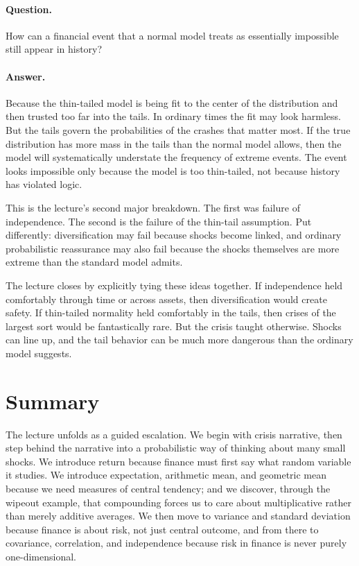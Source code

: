 \paragraph{Question.}
How can a financial event that a normal model treats as essentially impossible still appear in history?

\paragraph{Answer.}
Because the thin-tailed model is being fit to the center of the distribution and then trusted too far into the tails. In ordinary times the fit may look harmless. But the tails govern the probabilities of the crashes that matter most. If the true distribution has more mass in the tails than the normal model allows, then the model will systematically understate the frequency of extreme events. The event looks impossible only because the model is too thin-tailed, not because history has violated logic.

This is the lecture's second major breakdown. The first was failure of independence. The second is the failure of the thin-tail assumption. Put differently: diversification may fail because shocks become linked, and ordinary probabilistic reassurance may also fail because the shocks themselves are more extreme than the standard model admits.

The lecture closes by explicitly tying these ideas together. If independence held comfortably through time or across assets, then diversification would create safety. If thin-tailed normality held comfortably in the tails, then crises of the largest sort would be fantastically rare. But the crisis taught otherwise. Shocks can line up, and the tail behavior can be much more dangerous than the ordinary model suggests.

\section{Summary}

The lecture unfolds as a guided escalation. We begin with crisis narrative, then step behind the narrative into a probabilistic way of thinking about many small shocks. We introduce return because finance must first say what random variable it studies. We introduce expectation, arithmetic mean, and geometric mean because we need measures of central tendency; and we discover, through the wipeout example, that compounding forces us to care about multiplicative rather than merely additive averages. We then move to variance and standard deviation because finance is about risk, not just central outcome, and from there to covariance, correlation, and independence because risk in finance is never purely one-dimensional.

